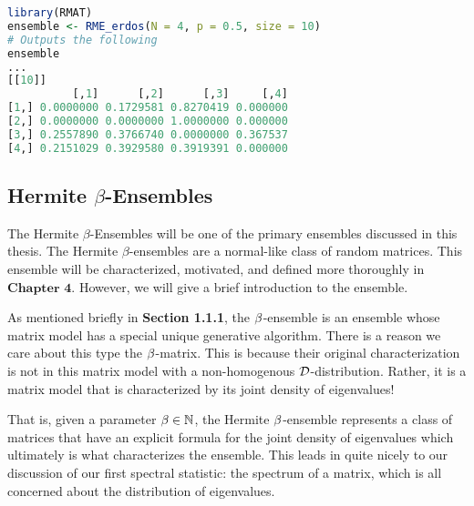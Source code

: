 \begin{lstlisting}[language=R]
library(RMAT)
ensemble <- RME_erdos(N = 4, p = 0.5, size = 10)
# Outputs the following
ensemble
...
[[10]]
          [,1]      [,2]      [,3]     [,4]
[1,] 0.0000000 0.1729581 0.8270419 0.000000
[2,] 0.0000000 0.0000000 1.0000000 0.000000
[3,] 0.2557890 0.3766740 0.0000000 0.367537
[4,] 0.2151029 0.3929580 0.3919391 0.000000
\end{lstlisting}


\subsection{Hermite $\beta$-Ensembles}

The Hermite $\beta$-Ensembles will be one of the primary ensembles discussed in this thesis. The Hermite $\beta$-ensembles are a normal-like class of random matrices.
This ensemble will be characterized, motivated, and defined more thoroughly in $\textbf{Chapter 4}$. However, we will give a brief introduction to the ensemble.

As mentioned briefly in \textbf{Section 1.1.1}, the $\beta$-ensemble is an ensemble whose matrix model has a special unique generative algorithm. There is a reason we
care about this type the $\beta$-matrix. This is because their original characterization is not in this matrix model with a non-homogenous $\mathcal{D}$-distribution. Rather, it is
a matrix model that is characterized by its joint density of eigenvalues!

That is, given a parameter $\beta \in \mathbb{N}$, the Hermite $\beta$-ensemble represents a class of matrices that have an explicit formula for the joint density of eigenvalues which
ultimately is what characterizes the ensemble. This leads in quite nicely to our discussion of our first spectral statistic: the spectrum of a matrix, which is all concerned
about the distribution of eigenvalues.



\begin{center}
  \Ddisttable
\end{center}
